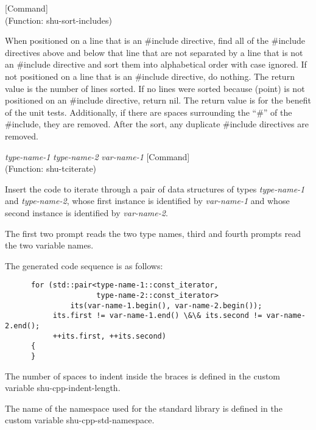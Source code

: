 \vspace{1em}
\noindent
{}
\usebox{\funcname}
 \hfill [Command]\\%
 (Function: shu-sort-includes)

\begin{doc-string}
When positioned on a line that is an \#include directive, find all of the
\#include directives above and below that line that are not separated by a line
that is not an \#include directive and sort them into alphabetical order with
case ignored.  If not positioned on a line that is an \#include directive, do
nothing.  The return value is the number of lines sorted.  If no lines were
sorted because (point) is not positioned on an \#include directive, return nil.
The return value is for the benefit of the unit tests.  Additionally, if there
are spaces surrounding the ``\#'' of the \#include, they are removed.  After the
sort, any duplicate \#include directives are removed.
\end{doc-string}

\vspace{1em}
\noindent
{}
\usebox{\funcname}\emph{type-name-1} \emph{type-name-2} \emph{var-name-1}
 \hfill [Command]
\hspace*{\wd\funcname}\\%
 (Function: shu-tciterate)

\begin{doc-string}
Insert the code to iterate through a pair of data structures of types
\emph{type-name-1} and \emph{type-name-2}, whose first instance is identified by \emph{var-name-1}
and whose second instance is identified by \emph{var-name-2}.

The first two prompt reads the two type names, third and fourth prompts read the
two variable names.

The generated code sequence is as follows:

\small{\begin{verbatim}
      for (std::pair<type-name-1::const_iterator,
                     type-name-2::const_iterator>
               its(var-name-1.begin(), var-name-2.begin());
           its.first != var-name-1.end() \&\& its.second != var-name-2.end();
           ++its.first, ++its.second)
      {
      }
\end{verbatim}}

The number of spaces to indent inside the braces is defined in the custom
variable shu-cpp-indent-length.

The name of the namespace used for the standard library is defined in the custom
variable shu-cpp-std-namespace.
\end{doc-string}

